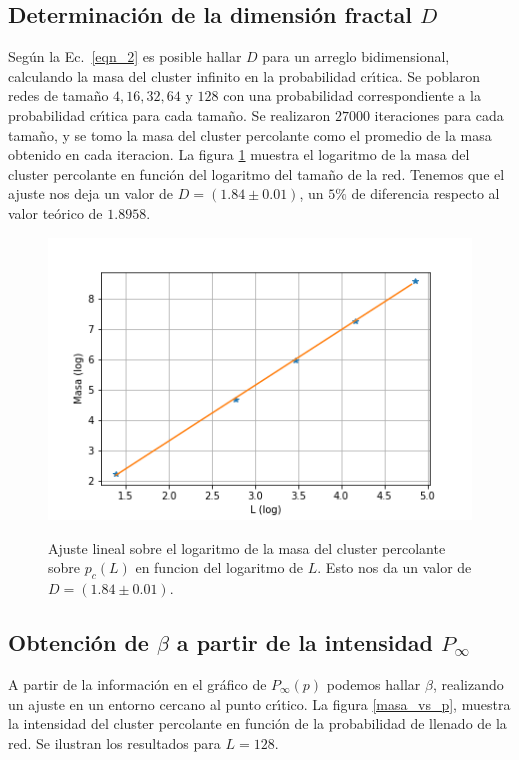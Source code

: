 \documentclass[
 reprint,
 amsmath,amssymb,
 aps,
]{revtex4-1}
\begin{document}
\subsection{\label{D} Determinaci\'on de la dimensi\'on fractal $D$ }

Seg\'un la Ec.~\ref{eqn_2} es posible hallar $D$ para un arreglo bidimensional, calculando la masa del cluster infinito en la probabilidad cr\'\i tica. Se poblaron redes de tama\~no $4, 16, 32, 64$ y $128$ con una probabilidad correspondiente a la probabilidad cr\'\i tica para cada tama\~no. Se realizaron $27000$ iteraciones para cada tama\~no, y se tomo la masa del cluster percolante como el promedio de la masa obtenido en cada iteracion. La figura \ref{masa_vs_L} muestra el logaritmo de la masa del cluster percolante en funci\'on del logaritmo del tamaño de la red. Tenemos que el ajuste nos deja un valor de $D = (1.84 \pm 0.01)$, un $5\%$ de diferencia respecto al valor te\'orico de $1.8958$.

\begin{figure}[ht]
\begin{center}
\includegraphics[scale=0.62]{../images/masa_vs_L.png} \\
\caption{Ajuste lineal sobre el logaritmo de la masa del cluster percolante sobre $p_c(L)$ en funcion del logaritmo de $L$. Esto nos da un valor de $D = (1.84 \pm 0.01)$.}\label{masa_vs_L}
\end{center}
\end{figure}

\subsection{\label{P} Obtenci\'on de $\beta$ a partir de la intensidad $P_\infty$}

A partir de la informaci\'on en el gr\'afico de $P_\infty(p)$ podemos hallar $\beta$, realizando un ajuste en un entorno cercano al punto cr\'\i tico. La figura \ref{masa_vs_p}, muestra la intensidad del cluster percolante en funci\'on de la probabilidad de llenado de la red. Se ilustran los resultados para $L = 128$.
\end{document}
